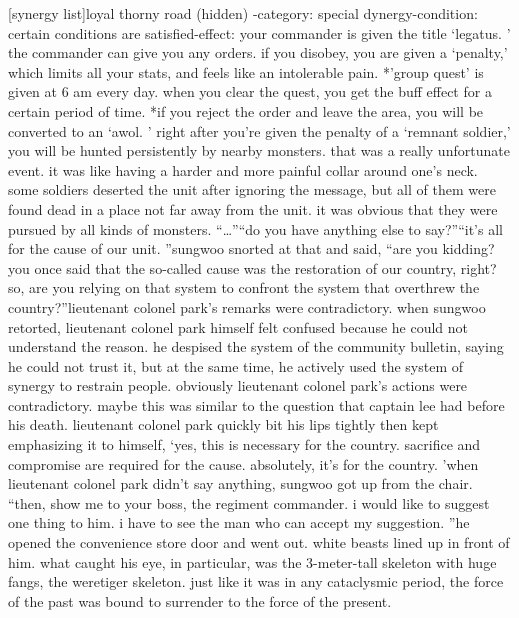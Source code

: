 [synergy list]loyal thorny road (hidden) -category: special dynergy-condition: certain conditions are satisfied-effect: your commander is given the title ‘legatus.
’ the commander can give you any orders.
 if you disobey, you are given a ‘penalty,’ which limits all your stats, and feels like an intolerable pain.
*’group quest’ is given at 6 am every day.
 when you clear the quest, you get the buff effect for a certain period of time.
*if you reject the order and leave the area, you will be converted to an ‘awol.
’ right after you’re given the penalty of a ‘remnant soldier,’ you will be hunted persistently by nearby monsters.
that was a really unfortunate event.
 it was like having a harder and more painful collar around one’s neck.
 some soldiers deserted the unit after ignoring the message, but all of them were found dead in a place not far away from the unit.
 it was obvious that they were pursued by all kinds of monsters.
“…”“do you have anything else to say?”“it’s all for the cause of our unit.
”sungwoo snorted at that and said, “are you kidding? you once said that the so-called cause was the restoration of our country, right? so, are you relying on that system to confront the system that overthrew the country?”lieutenant colonel park’s remarks were contradictory.
 when sungwoo retorted, lieutenant colonel park himself felt confused because he could not understand the reason.
he despised the system of the community bulletin, saying he could not trust it, but at the same time, he actively used the system of synergy to restrain people.
obviously lieutenant colonel park’s actions were contradictory.
 maybe this was similar to the question that captain lee had before his death.
 lieutenant colonel park quickly bit his lips tightly then kept emphasizing it to himself, ‘yes, this is necessary for the country.
 sacrifice and compromise are required for the cause.
 absolutely, it’s for the country.
’when lieutenant colonel park didn’t say anything, sungwoo got up from the chair.
“then, show me to your boss, the regiment commander.
 i would like to suggest one thing to him.
 i have to see the man who can accept my suggestion.
”he opened the convenience store door and went out.
 white beasts lined up in front of him.
what caught his eye, in particular, was the 3-meter-tall skeleton with huge fangs, the weretiger skeleton.
just like it was in any cataclysmic period, the force of the past was bound to surrender to the force of the present.


 